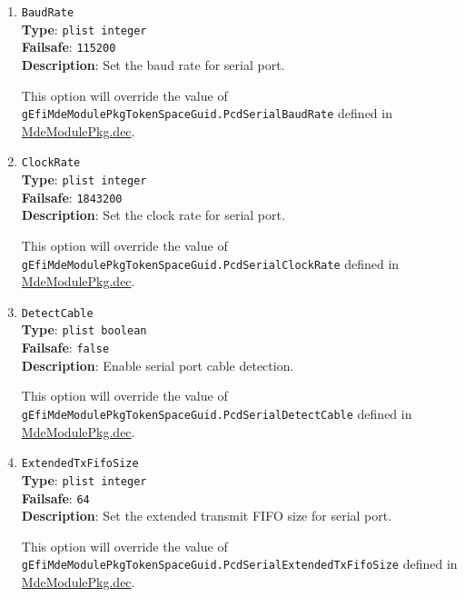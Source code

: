 \documentclass[]{article}
\begin{document}
\begin{enumerate}
\item
  \texttt{BaudRate}\\
  \textbf{Type}: \texttt{plist\ integer}\\
  \textbf{Failsafe}: \texttt{115200}\\
  \textbf{Description}: Set the baud rate for serial port.

  This option will override the value of \texttt{gEfiMdeModulePkgTokenSpaceGuid.PcdSerialBaudRate}
  defined in \href{https://github.com/acidanthera/audk/blob/master/MdeModulePkg/MdeModulePkg.dec}{MdeModulePkg.dec}.

\item
  \texttt{ClockRate}\\
  \textbf{Type}: \texttt{plist\ integer}\\
  \textbf{Failsafe}: \texttt{1843200}\\
  \textbf{Description}: Set the clock rate for serial port.

  This option will override the value of \texttt{gEfiMdeModulePkgTokenSpaceGuid.PcdSerialClockRate}
  defined in \href{https://github.com/acidanthera/audk/blob/master/MdeModulePkg/MdeModulePkg.dec}{MdeModulePkg.dec}.

\item
  \texttt{DetectCable}\\
  \textbf{Type}: \texttt{plist\ boolean}\\
  \textbf{Failsafe}: \texttt{false}\\
  \textbf{Description}: Enable serial port cable detection.

  This option will override the value of \texttt{gEfiMdeModulePkgTokenSpaceGuid.PcdSerialDetectCable}
  defined in \href{https://github.com/acidanthera/audk/blob/master/MdeModulePkg/MdeModulePkg.dec}{MdeModulePkg.dec}.

\item
  \texttt{ExtendedTxFifoSize}\\
  \textbf{Type}: \texttt{plist\ integer}\\
  \textbf{Failsafe}: \texttt{64}\\
  \textbf{Description}: Set the extended transmit FIFO size for serial port.

  This option will override the value of \texttt{gEfiMdeModulePkgTokenSpaceGuid.PcdSerialExtendedTxFifoSize}
  defined in \href{https://github.com/acidanthera/audk/blob/master/MdeModulePkg/MdeModulePkg.dec}{MdeModulePkg.dec}.


\end{enumerate}
\end{document}
